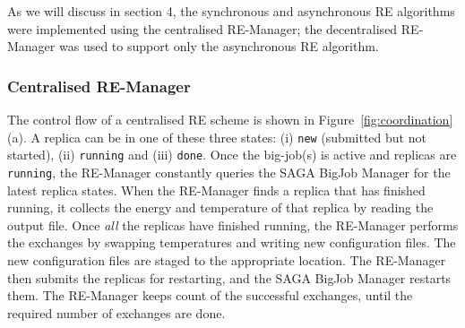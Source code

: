 \documentclass{rspublic}
\newcommand{\jhanote}[1]{ {\textcolor{red} { ***shantenu: #1 }}}
\newcommand{\jhanote}[1]{}
\begin{document}




As we will discuss in section 4, the synchronous and asynchronous RE
algorithms were implemented using the centralised RE-Manager; the
decentralised RE-Manager was used to support only the asynchronous RE
algorithm.


\subsubsection{Centralised RE-Manager}



The control flow of a centralised RE scheme is shown in
Figure~\ref{fig:coordination}(a). %
A replica can be in one of these three states:
(i) \texttt{new} (submitted but not started), (ii) \texttt{running}
and (iii) \texttt{done}.  Once the big-job(s) is active and replicas
are \texttt{running}, the RE-Manager constantly queries the SAGA
BigJob Manager for the latest replica states.  When the RE-Manager
finds a replica that has finished running, it collects the energy and
temperature of that replica by reading the output file. Once
\emph{all} the replicas have finished running, the RE-Manager performs
the exchanges by swapping temperatures and writing new configuration
files. The new configuration files are staged to the appropriate
location. The RE-Manager then submits the replicas for restarting, and
the SAGA BigJob Manager restarts them. The RE-Manager keeps count of
the successful exchanges, until the required number of exchanges are
done.
\end{document}
